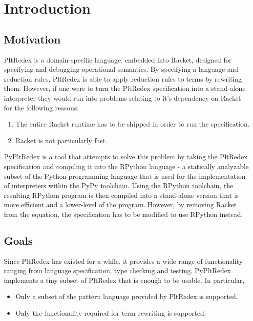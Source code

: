 \chapter{Introduction}
\section{Motivation}
PltRedex is a domain-specific language, embedded into Racket, designed for specifying and debugging operational semantics. By specifying a language and reduction rules, PltRedex is able to apply reduction rules to terms by rewriting them.
However, if one were to turn the PltRedex specification into a stand-alone interpreter they would run into problems relating to it's dependency on Racket for the following reasons:

\begin{enumerate}
\item
The entire Racket runtime has to be shipped in order to run the specification.
\item
Racket is not particularly fast.
\end{enumerate}

PyPltRedex is a tool that attempts to solve this problem by taking the PltRedex specification and compiling it into the RPython language - a statically analyzable subset of the Python programming language that is used for the implementation of interpreters within the PyPy toolchain. Using the RPython toolchain, the resulting RPython program is then compiled into a stand-alone version that is more efficient and a lower-level of the program. However, by removing Racket from the equation, the specification has to be modified to use RPython instead.

\section{Goals}
Since PltRedex has existed for a while, it provides a wide range of functionality ranging from language specification, type checking and testing. PyPltRedex implements a tiny subset of PltRedex that is enough to be usable. In particular,

\begin{itemize}
\item Only a subset of the pattern language provided by PltRedex is supported.
\item
Only the functionality required for term rewriting is supported.
\end{itemize}


